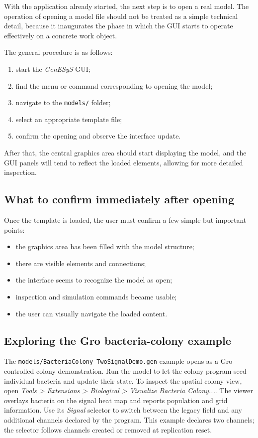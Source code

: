 With the application already started, the next step is to open a real model. The operation of opening a model file should not be treated as a simple technical detail, because it inaugurates the phase in which the GUI starts to operate effectively on a concrete work object.

The general procedure is as follows:
\begin{enumerate}
\item start the \textit{GenESyS} GUI;
\item find the menu or command corresponding to opening the model;
\item navigate to the \texttt{models/} folder;
\item select an appropriate template file;
\item confirm the opening and observe the interface update.
\end{enumerate}

After that, the central graphics area should start displaying the model, and the GUI panels will tend to reflect the loaded elements, allowing for more detailed inspection.

\subsection{What to confirm immediately after opening}
\label{subsec:cap4_confirmar_apos_abertura}

Once the template is loaded, the user must confirm a few simple but important points:

\begin{itemize}
\item the graphics area has been filled with the model structure;
\item there are visible elements and connections;
\item the interface seems to recognize the model as open;
\item inspection and simulation commands became usable;
\item the user can visually navigate the loaded content.
\end{itemize}

\subsection{Exploring the Gro bacteria-colony example}
\label{subsec:gro_bacteria_colony_example}

The \texttt{models/BacteriaColony\_TwoSignalDemo.gen} example opens as a
Gro-controlled colony demonstration. Run the model to let the colony program
seed individual bacteria and update their state. To inspect the spatial
colony view, open \textit{Tools > Extensions > Biological > Visualize Bacteria
Colony...}. The viewer overlays bacteria on the signal heat map and reports
population and grid information. Use its \textit{Signal} selector to switch
between the legacy field and any additional channels declared by the program.
This example declares two channels; the selector follows channels created or
removed at replication reset.

